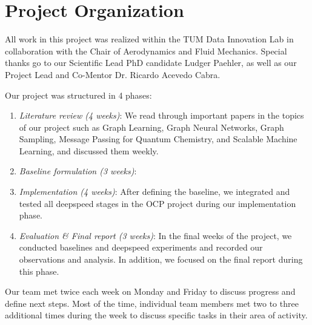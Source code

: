 \section*{Project Organization}

All work in this project was realized within the TUM Data Innovation Lab in collaboration with the Chair of 
Aerodynamics and Fluid Mechanics. Special thanks go to our Scientific Lead PhD candidate Ludger Paehler, 
as well as our Project Lead and Co-Mentor Dr. Ricardo Acevedo Cabra.

Our project was structured in 4 phases:

\begin{enumerate}
    \item \textit{Literature review (4 weeks)}: We read through important papers in the topics of our project such 
    as Graph Learning, Graph Neural Networks, Graph Sampling, Message Passing for Quantum Chemistry, 
    and Scalable Machine Learning, and discussed them weekly.
    \item \textit{Baseline formulation (3 weeks)}: 
    \item \textit{Implementation (4 weeks)}: After defining the baseline, we integrated and tested all deepspeed 
    stages in the OCP project during our implementation phase.
    \item \textit{Evaluation & Final report (3 weeks)}: In the final weeks of the project, we conducted baselines 
    and deepspeed experiments and recorded our observations and analysis. In addition, we focused on the final 
    report during this phase.
\end{enumerate}

Our team met twice each week on Monday and Friday to discuss progress and define next steps. Most of 
the time, individual team members met two to three additional times during the week to discuss specific 
tasks in their area of activity. 